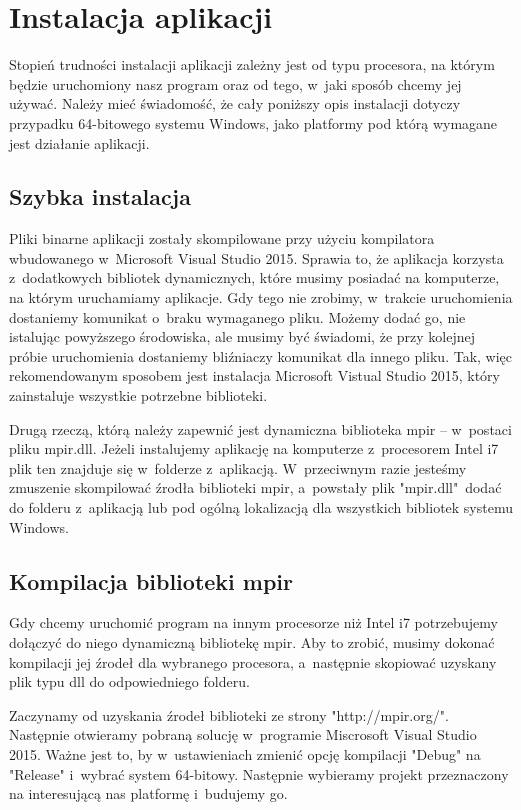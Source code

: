 \section{Instalacja aplikacji}

Stopień trudności instalacji aplikacji zależny jest od typu procesora, na którym będzie uruchomiony nasz program oraz od tego, w~jaki sposób chcemy jej używać. Należy mieć świadomość, że cały poniższy opis instalacji dotyczy przypadku 64-bitowego systemu Windows, jako platformy pod którą wymagane jest działanie aplikacji.

\subsection{Szybka instalacja}

Pliki binarne aplikacji zostały skompilowane przy użyciu kompilatora wbudowanego w~Microsoft Visual Studio 2015. Sprawia to, że aplikacja korzysta z~dodatkowych bibliotek dynamicznych, które musimy posiadać na komputerze, na którym uruchamiamy aplikacje. Gdy tego nie zrobimy, w~trakcie uruchomienia dostaniemy komunikat o~braku wymaganego pliku. Możemy dodać go, nie istalując powyższego środowiska, ale musimy być świadomi, że przy kolejnej próbie uruchomienia dostaniemy bliźniaczy komunikat dla innego pliku. Tak, więc rekomendowanym sposobem jest instalacja Microsoft Vistual Studio 2015, który zainstaluje wszystkie potrzebne biblioteki.

Drugą rzeczą, którą należy zapewnić jest dynamiczna biblioteka mpir -- w~postaci pliku mpir.dll. Jeżeli instalujemy aplikację na komputerze z~procesorem Intel i7 plik ten znajduje się w~folderze z~aplikacją. W~przeciwnym razie jesteśmy zmuszenie skompilować źrodła biblioteki mpir, a~powstały plik "mpir.dll"\ dodać do folderu z~aplikacją lub pod ogólną lokalizacją dla wszystkich bibliotek systemu Windows.

\subsection{Kompilacja biblioteki mpir}

Gdy chcemy uruchomić program na innym procesorze niż Intel i7 potrzebujemy dołączyć do niego dynamiczną bibliotekę mpir. Aby to zrobić, musimy dokonać kompilacji jej źrodeł dla wybranego procesora, a~następnie skopiować uzyskany plik typu dll do odpowiedniego folderu.

Zaczynamy od uzyskania źrodeł biblioteki ze strony "http://mpir.org/". Następnie otwieramy pobraną solucję w~programie Miscrosoft Visual Studio 2015. Ważne jest to, by w~ustawieniach zmienić opcję kompilacji "Debug" na "Release" i~wybrać system 64-bitowy. Następnie wybieramy projekt przeznaczony na interesującą nas platformę i~budujemy go.

